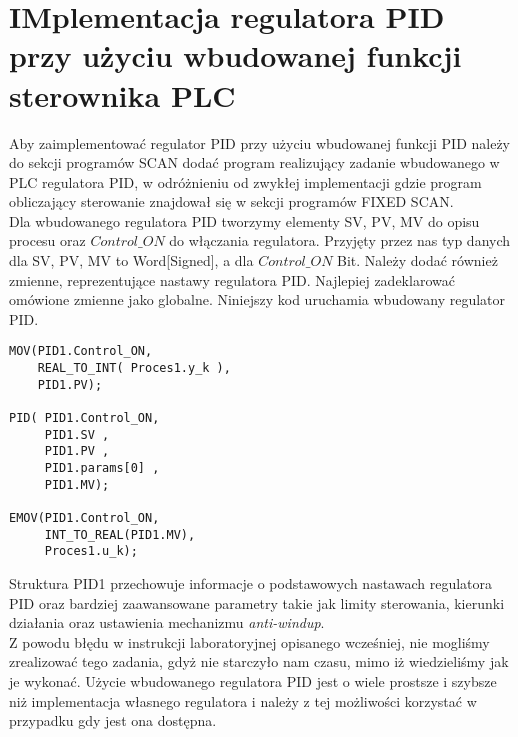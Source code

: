 \chapter{IMplementacja regulatora PID przy użyciu wbudowanej funkcji sterownika PLC}
\label{pid_wbudowany}
Aby zaimplementować regulator PID przy użyciu wbudowanej funkcji PID należy 
do sekcji programów SCAN dodać program realizujący zadanie wbudowanego w PLC regulatora PID, w 
odróżnieniu od zwykłej implementacji gdzie program obliczający sterowanie znajdował się w sekcji programów 
FIXED SCAN. \\

Dla wbudowanego regulatora PID tworzymy elementy SV, PV, 
MV do opisu procesu oraz $Control\_ON$ do włączania regulatora. Przyjęty przez nas typ danych dla 
SV, PV, MV to Word[Signed], a dla $Control\_ON$ Bit. Należy dodać również zmienne, 
reprezentujące nastawy regulatora PID. Najlepiej zadeklarować omówione zmienne jako globalne. 
Niniejszy kod uruchamia wbudowany regulator PID.

\begin{lstlisting}[caption={Użycie wbudowanego regulatora PID}]
MOV(PID1.Control_ON, 
    REAL_TO_INT( Proces1.y_k ),
    PID1.PV);

PID( PID1.Control_ON, 
     PID1.SV , 
     PID1.PV , 
     PID1.params[0] , 
     PID1.MV);

EMOV(PID1.Control_ON, 
     INT_TO_REAL(PID1.MV), 
     Proces1.u_k);
\end{lstlisting}

Struktura PID1 przechowuje informacje o podstawowych nastawach regulatora PID oraz bardziej zaawansowane 
parametry takie jak limity sterowania, kierunki działania oraz ustawienia mechanizmu \textit{anti-windup}.\\

Z powodu błędu w instrukcji laboratoryjnej opisanego wcześniej, nie mogliśmy zrealizować tego zadania, gdyż 
nie starczyło nam czasu, mimo iż wiedzieliśmy jak je wykonać. 
Użycie wbudowanego regulatora PID jest o wiele prostsze i szybsze niż implementacja własnego regulatora
i należy z tej możliwości korzystać w przypadku gdy jest ona dostępna.


